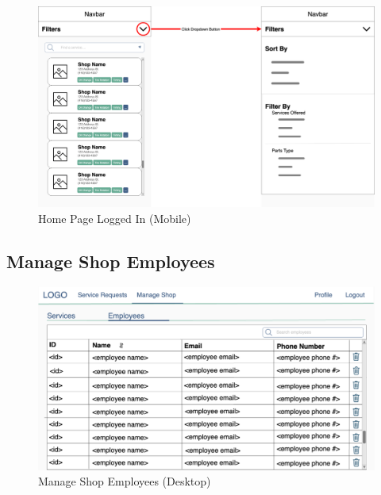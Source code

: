 \documentclass[12pt, titlepage]{article}
\begin{document}
\begin{figure}[H]
	\centering
	\includegraphics[width=\textwidth]{mockups/Home Page (Mobile).png}
	\caption{Home Page \textemdash{} Logged In (Mobile)}
\end{figure}

\subsection{Manage Shop Employees}

\begin{figure}[H]
	\centering
	\includegraphics[width=\textwidth]{mockups/Manage Shop (Employees) (Desktop).png}
	\caption{Manage Shop \textemdash{} Employees (Desktop)}
\end{figure}
\end{document}

